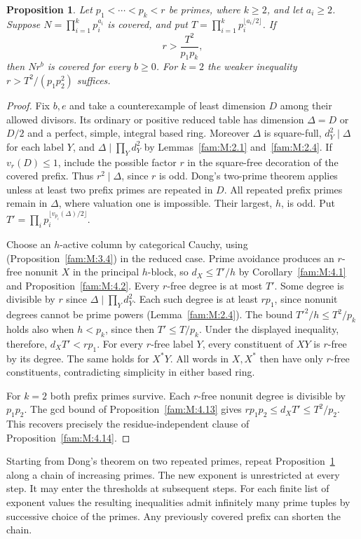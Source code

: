 \documentclass[11pt,a4paper]{article}
\numberwithin{equation}{section}
\newtheorem{proposition}[theorem]{Proposition}
\theoremstyle{remark}
\begin{document}
\begin{proposition}\label{ext:gap:adjoin}
Let $p_1<\cdots<p_k<r$ be primes, where $k\ge2$, and let $a_i\ge2$.
Suppose $N=\prod_{i=1}^k p_i^{a_i}$ is covered, and put
$T=\prod_{i=1}^k p_i^{\lfloor a_i/2\rfloor}$. If
\[
                       r>\frac{T^2}{p_1p_k},
\]
then $Nr^b$ is covered for every $b\ge0$. For $k=2$ the weaker
inequality $r>T^2/(p_1p_2^2)$ suffices.
\end{proposition}
\begin{proof}
Fix $b,e$ and take a counterexample of least dimension $D$ among their
allowed divisors. Its ordinary or positive reduced table has dimension
$\Delta=D$ or $D/2$ and a perfect, simple, integral based ring.
Moreover $\Delta$ is square-full, $d_Y^2\mid\Delta$ for each label $Y$,
and $\Delta\mid\prod_Yd_Y^2$ by Lemmas~\ref{fam:M:2.1} and~\ref{fam:M:2.4}.
If $v_r(D)\le1$, include the possible factor $r$ in the square-free
decoration of the covered prefix. Thus $r^2\mid\Delta$, since $r$ is
odd. Dong's two-prime theorem applies unless at least two prefix primes
are repeated in $D$. All repeated prefix primes remain in $\Delta$, where valuation one is
impossible. Their largest, $h$, is odd. Put
$T'=\prod_i p_i^{\lfloor v_{p_i}(\Delta)/2\rfloor}$.

Choose an $h$-active column by categorical Cauchy, using
(Proposition~\ref{fam:M:3.4}) in the reduced case. Prime avoidance produces
an $r$-free nonunit $X$ in the principal $h$-block, so $d_X\le T'/h$
by Corollary~\ref{fam:M:4.1} and Proposition~\ref{fam:M:4.2}. Every $r$-free degree
is at most $T'$. Some degree is divisible by $r$ since
$\Delta\mid\prod_Yd_Y^2$. Each such degree is at least $rp_1$, since
nonunit degrees cannot be prime powers (Lemma~\ref{fam:M:2.4}).
The bound $T'^2/h\le T^2/p_k$ holds also when $h<p_k$, since then
$T'\le T/p_k$. Under the displayed inequality, therefore,
$d_XT'<rp_1$. For every $r$-free label $Y$, every constituent of $XY$
is $r$-free by its degree. The same holds for $X^*Y$. All words in
$X,X^*$ then have only $r$-free constituents, contradicting simplicity
in either based ring.

For $k=2$ both prefix primes survive. Each $r$-free nonunit degree
is divisible by $p_1p_2$. The gcd bound of
Proposition~\ref{fam:M:4.13} gives $rp_1p_2\le d_XT'\le T^2/p_2$.
This recovers precisely the residue-independent clause of
Proposition~\ref{fam:M:4.14}.
\end{proof}

Starting from Dong's theorem on two repeated primes, repeat
Proposition~\ref{ext:gap:adjoin} along a chain of increasing primes. The
new exponent is unrestricted at every step. It may enter the thresholds
at subsequent steps. For each finite list of exponent values the resulting
inequalities admit infinitely many prime tuples by successive choice
of the primes. Any previously covered prefix can shorten the chain.
\end{document}
